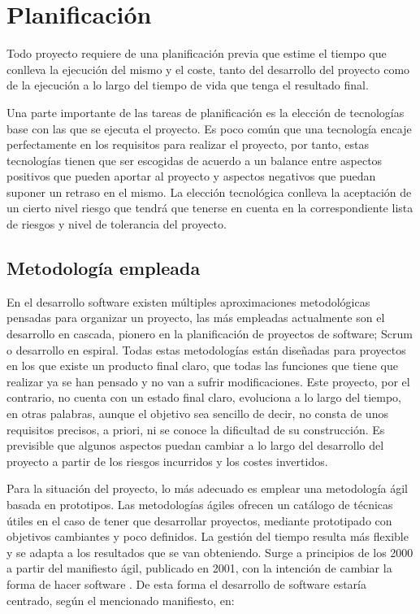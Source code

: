 \chapter{Planificación}\label{Cap2}

Todo proyecto requiere de una planificación previa que estime el tiempo que conlleva la ejecución del mismo y el coste, tanto del desarrollo del proyecto como de la ejecución a lo largo del tiempo de vida que tenga el resultado final.

Una parte importante de las tareas de planificación es la elección de tecnologías base con las que se ejecuta el proyecto. Es poco común que una tecnología encaje perfectamente en los requisitos para realizar el proyecto, por tanto, estas tecnologías tienen que ser escogidas de acuerdo a un balance entre aspectos positivos que pueden aportar al proyecto y aspectos negativos que puedan suponer un retraso en el mismo. La elección tecnológica conlleva la aceptación de un cierto nivel riesgo que tendrá que tenerse en cuenta en la correspondiente lista de riesgos y nivel de tolerancia del proyecto.

\section{Metodología empleada} \label{methodology}

En el desarrollo software existen múltiples aproximaciones metodológicas pensadas para organizar un proyecto, las más empleadas actualmente son el desarrollo en cascada, pionero en la planificación de proyectos de software; Scrum o desarrollo en espiral. Todas estas metodologías están diseñadas para proyectos en los que existe un producto final claro, que todas las funciones que tiene que realizar ya se han pensado y no van a sufrir modificaciones. Este proyecto, por el contrario, no cuenta con un estado final claro, evoluciona a lo largo del tiempo, en otras palabras, aunque el objetivo sea sencillo de decir, no consta de unos requisitos precisos, a priori, ni se conoce la dificultad de su construcción. Es previsible que algunos aspectos puedan cambiar a lo largo del desarrollo del proyecto a partir de los riesgos incurridos y los costes invertidos.

Para la situación del proyecto, lo más adecuado es emplear una metodología ágil basada en prototipos. Las metodologías ágiles ofrecen un catálogo de técnicas útiles en el caso de tener que desarrollar proyectos, mediante prototipado con objetivos cambiantes y poco definidos. La gestión del tiempo resulta más flexible y se adapta a los resultados que se van obteniendo. Surge a principios de los 2000 a partir del manifiesto ágil, publicado en 2001, con la intención de cambiar la forma de hacer software \cite{agilemanifesto}. De esta forma el desarrollo de software estaría centrado, según el mencionado manifiesto, en:

